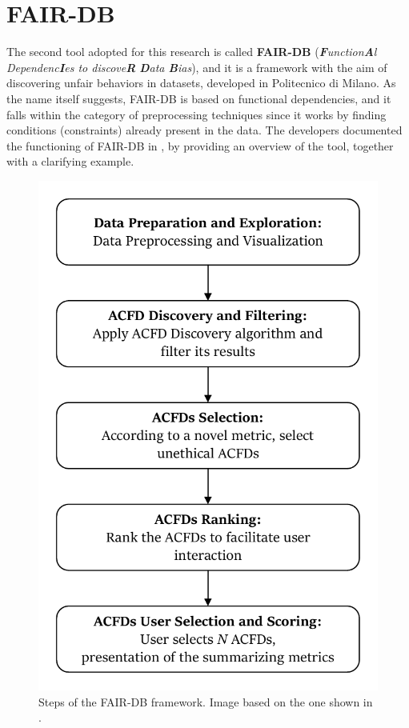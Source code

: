 \section{FAIR-DB}
The second tool adopted for this research is called \textbf{FAIR-DB} (\textit{\textbf{F}unction\textbf{A}l Dependenc\textbf{I}es to discove\textbf{R} \textbf{D}ata \textbf{B}ias}), and it is a framework with the aim of discovering unfair behaviors in datasets, developed in Politecnico di Milano. As the name itself suggests, FAIR-DB is based on functional dependencies, and it falls within the category of preprocessing techniques since it works by finding conditions (constraints) already present in the data. The developers documented the functioning of FAIR-DB in \cite{azzalini2021fair}, by providing an overview of the tool, together with a clarifying example.

\begin{figure}[h!]
\includegraphics[scale=.75]{figures/fair-db_framework.pdf}
\centering
\caption{Steps of the FAIR-DB framework. Image based on the one shown in \cite{azzalini2021fair}.}
\label{fig:fair-db_framework}
\end{figure}

